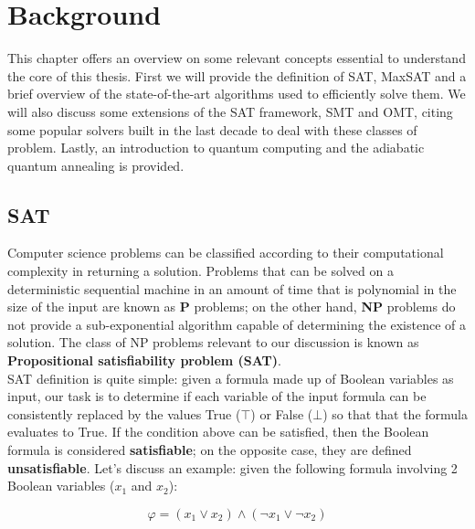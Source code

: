 \chapter{Background}
\label{cha:introQA}

This chapter offers an overview on some relevant concepts essential to understand the core of this thesis. First we will provide the definition of SAT, MaxSAT and a brief overview of the state-of-the-art algorithms used to efficiently solve them. We will also discuss some extensions of the SAT framework, SMT and OMT, citing some popular solvers built in the last decade to deal with these classes of problem. Lastly, an introduction to quantum computing and the adiabatic quantum annealing is provided.

\section{SAT}
\label{sec:sat}

Computer science problems can be classified according to their computational complexity in returning a solution. Problems that can be solved on a deterministic sequential machine in an amount of time that is polynomial in the size of the input are known as \textbf{P} problems; on the other hand, \textbf{NP} problems do not provide a sub-exponential algorithm capable of determining the existence of a solution. The class of NP problems relevant to our discussion is known as \textbf{Propositional satisfiability problem (SAT)}. \\
SAT definition is quite simple: given a formula made up of Boolean variables as input, our task is to determine if each variable of the input formula can be consistently replaced by the values True ($\top$) or False ($\bot$) so that that the formula evaluates to True. If the condition above can be satisfied, then the Boolean formula is considered \textbf{satisfiable}; on the opposite case, they are defined \textbf{unsatisfiable}. Let's discuss an example: given the following formula involving 2 Boolean variables ($x_1$ and $x_2$):

\begin{equation}
    \varphi = ( x_1 \vee x_2) \wedge (\neg x_1 \vee \neg x_2)
\end{equation}

